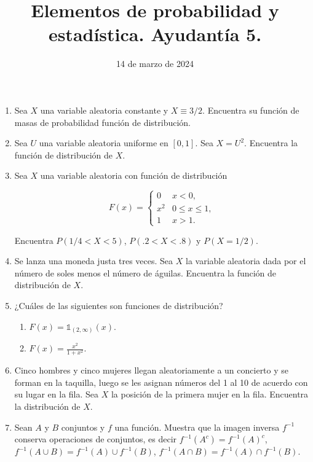 \documentclass{article}
\title{Elementos de probabilidad y estadística. Ayudantía 5.}
\date{14 de marzo de 2024}
\renewcommand{\P}[1]{P\left(#1\right)}
\begin{document}
\maketitle 

\begin{enumerate}

    \item Sea $X$ una variable aleatoria constante y $X \equiv 3/2$. Encuentra su función de masas de probabilidad función de distribución.

    \item Sea $U$ una variable aleatoria uniforme en $[0,1]$. Sea $X = U^2$. Encuentra la función de distribución de $X$.
    
    \item Sea $X$ una variable aleatoria con función de distribución 
    
    \[ F(x) = \left\{ \begin{array}{cc}
        0   & x < 0,\\
        x^2 & 0 \le x \le 1,\\
        1   & x > 1.
    \end{array} \right. \]

    Encuentra $\P{1/4 < X < 5}$, $\P{.2 < X < .8}$ y $\P{X = 1/2}$.

    \item Se lanza una moneda justa tres veces. Sea $X$ la variable aleatoria dada por el número de soles menos el número de águilas. Encuentra la función de distribución de $X$.
    
    \item ¿Cuáles de las siguientes son funciones de distribución?
    
    \begin{enumerate}
        \item $F(x) = \mathds{1}_{(2,\infty)}(x)$.
        \item $F(x) = \frac{x^2}{1 + x^2}$.
    \end{enumerate}

    \item Cinco hombres y cinco mujeres llegan aleatoriamente a un concierto y se forman en la taquilla, luego se les asignan números del 1 al 10 de acuerdo con su lugar en la fila. Sea $X$ la posición de la primera mujer en la fila. Encuentra la distribución de $X$.
    
    
    \item Sean $A$ y $B$ conjuntos y $f$ una función. Muestra que la imagen inversa $f^{-1}$ conserva operaciones de conjuntos, es decir $f^{-1}(A^c) = f^{-1}(A)^c$, $f^{-1}(A\cup B) = f^{-1}(A)\cup f^{-1}(B)$, $f^{-1}(A\cap B) = f^{-1}(A)\cap f^{-1}(B)$.
    

\end{enumerate}
\end{document}
